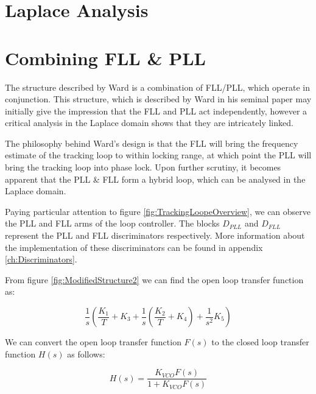 \clearpage

\section{Laplace Analysis}

\section{Combining FLL \& PLL}

The structure described by Ward is a combination of FLL/PLL, which operate in conjunction. This structure, which is described by Ward in his seminal paper  may initially give the impression that the FLL and PLL act independently, however a critical analysis in the Laplace domain shows that they are intricately linked\cite{Ward}.

The philosophy behind Ward's design is that the FLL will bring the frequency estimate of the tracking loop to within locking range, at which point the PLL will bring the tracking loop into phase lock. Upon further scrutiny, it becomes apparent that the PLL \& FLL form a hybrid loop, which can be analysed in the Laplace domain.


Paying particular attention to figure \ref{fig:TrackingLoopeOverview}, we can observe the PLL and FLL arms of the loop controller. The blocks $D_{PLL}$ and $D_{FLL}$ represent the PLL and FLL discriminators respectively. More information about the implementation of these discriminators can be found in appendix \ref{ch:Discriminators}. 








From figure \ref{fig:ModifiedStructure2} we can find the open loop transfer function as:

\begin{equation}
\frac{1}{s} (\frac{K_1}{T}+K_3 + \frac{1}{s}(\frac{K_2}{T}+K_4) + \frac{1}{s^2} K_5)
\label{eq:CombinedOpenLoopTF}
\end{equation}

We can convert the open loop transfer function $F(s)$ to the closed loop transfer function $H(s)$ as follows\cite{KazemiPHD,Gardner}:

\begin{equation}
 H(s) = \frac{K_{VCO}F(s)}{1+K_{VCO}F(s)}
\end{equation}

